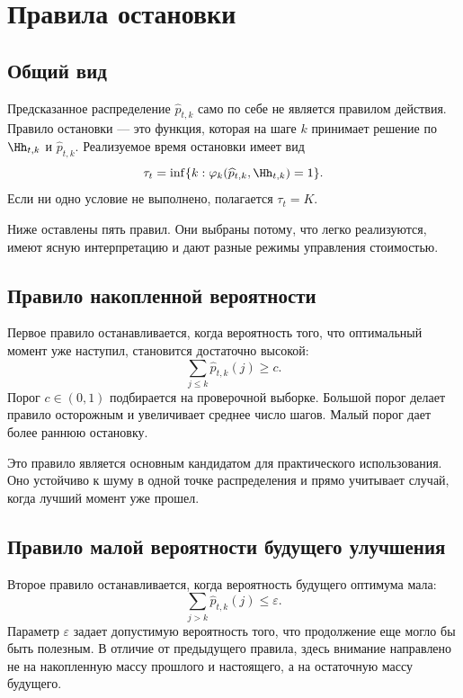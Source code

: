 \section{Правила остановки}

\subsection{Общий вид}

Предсказанное распределение \(\widehat p_{t,k}\) само по себе не является правилом действия. Правило остановки --- это функция, которая на шаге \(k\) принимает решение по \(\Hh_{t,k}\) и \(\widehat p_{t,k}\). Реализуемое время остановки имеет вид
\begin{equation}
  \tau_t=\inf\{k:\varphi_k(\widehat p_{t,k},\Hh_{t,k})=1\}.
  \label{eq:real_stopping_rule}
\end{equation}
Если ни одно условие не выполнено, полагается \(\tau_t=K\).

Ниже оставлены пять правил. Они выбраны потому, что легко реализуются, имеют ясную интерпретацию и дают разные режимы управления стоимостью.

\subsection{Правило накопленной вероятности}

Первое правило останавливается, когда вероятность того, что оптимальный момент уже наступил, становится достаточно высокой:
\begin{equation}
  \sum_{j\le k}\widehat p_{t,k}(j)\ge c.
  \label{eq:rule_cdf}
\end{equation}
Порог \(c\in(0,1)\) подбирается на проверочной выборке. Большой порог делает правило осторожным и увеличивает среднее число шагов. Малый порог дает более раннюю остановку.

Это правило является основным кандидатом для практического использования. Оно устойчиво к шуму в одной точке распределения и прямо учитывает случай, когда лучший момент уже прошел.

\subsection{Правило малой вероятности будущего улучшения}

Второе правило останавливается, когда вероятность будущего оптимума мала:
\begin{equation}
  \sum_{j>k}\widehat p_{t,k}(j)\le \varepsilon.
  \label{eq:rule_future}
\end{equation}
Параметр \(\varepsilon\) задает допустимую вероятность того, что продолжение еще могло бы быть полезным. В отличие от предыдущего правила, здесь внимание направлено не на накопленную массу прошлого и настоящего, а на остаточную массу будущего.

